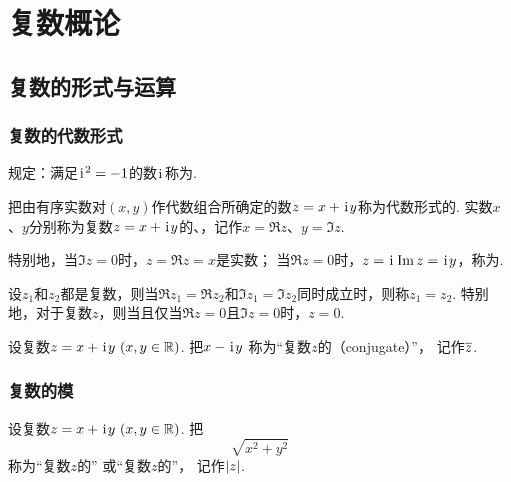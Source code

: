 \chapter{复数概论}
\section{复数的形式与运算}
\subsection{复数的代数形式}
\begin{definition}%
规定：满足\(\kern1pt\mathrm{i}\kern1pt^2=-1\)的数\(\kern1pt\mathrm{i}\kern1pt\)称为.
\end{definition}

\begin{definition}
把由有序实数对\((x,y)\)作代数组合所确定的数\(z = x + \kern1pt\mathrm{i}\kern1pt y\)称为代数形式的.
实数\(x\)、\(y\)分别称为复数\(z = x + \kern1pt\mathrm{i}\kern1pt y\)的、，记作\(x=\Re z\)、\(y=\Im z\).

特别地，当\(\Im z=0\)时，\(z=\Re z = x\)是实数；
当\(\Re z=0\)时，\(z=\kern1pt\mathrm{i}\kern1pt\Im z=\kern1pt\mathrm{i}\kern1pt y\)，称为.
\end{definition}

\begin{definition}%
设\(z_1\)和\(z_2\)都是复数，则当\(\Re z_1 = \Re z_2\)和\(\Im z_1 = \Im z_2\)同时成立时，则称\(z_1 = z_2\).
特别地，对于复数\(z\)，则当且仅当\(\Re z=0\)且\(\Im z=0\)时，\(z=0\).
\end{definition}

\begin{definition}%
设复数\(z = x + \kern1pt\mathrm{i}\kern1pt y\ (x,y \in \mathbb{R})\).
把\(x - \kern1pt\mathrm{i}\kern1pt y\)
称为“复数\(z\)的（conjugate）”，
记作\(\overline{z}\).
\end{definition}

\subsection{复数的模}
\begin{definition}%
设复数\(z = x + \kern1pt\mathrm{i}\kern1pt y\ (x,y \in \mathbb{R})\).
把\begin{equation*}
	\sqrt{x^2 + y^2}
\end{equation*}
称为“复数\(z\)的”
或“复数\(z\)的”，
记作\(\abs{z}\).
\end{definition}

